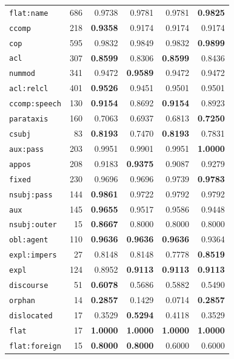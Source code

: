 \begin{table}[ht]
\begin{minipage}[t]{0.60\linewidth}
\begin{tabular}{l r  r r r r}
\texttt{flat\!:\!name} & 686 & 0.9738 & 0.9781 & 0.9781 & \textbf{0.9825} \\
\texttt{ccomp} & 218 & \textbf{0.9358} & 0.9174 & 0.9174 & 0.9174 \\
\texttt{cop} & 595 & 0.9832 & 0.9849 & 0.9832 & \textbf{0.9899} \\
\texttt{acl} & 307 & \textbf{0.8599} & 0.8306 & \textbf{0.8599} & 0.8436 \\
\texttt{nummod} & 341 & 0.9472 & \textbf{0.9589} & 0.9472 & 0.9472 \\
\texttt{acl\!:\!relcl} & 401 & \textbf{0.9526} & 0.9451 & 0.9501 & 0.9501 \\
\texttt{ccomp\!:\!speech} & 130 & \textbf{0.9154} & 0.8692 & \textbf{0.9154} & 0.8923 \\
\texttt{parataxis} & 160 & 0.7063 & 0.6937 & 0.6813 & \textbf{0.7250} \\
\texttt{csubj} & 83 & \textbf{0.8193} & 0.7470 & \textbf{0.8193} & 0.7831 \\
\texttt{aux\!:\!pass} & 203 & 0.9951 & 0.9901 & 0.9951 & \textbf{1.0000} \\
\texttt{appos} & 208 & 0.9183 & \textbf{0.9375} & 0.9087 & 0.9279 \\
\texttt{fixed} & 230 & 0.9696 & 0.9696 & 0.9739 & \textbf{0.9783} \\
\texttt{nsubj\!:\!pass} & 144 & \textbf{0.9861} & 0.9722 & 0.9792 & 0.9792 \\
\texttt{aux} & 145 & \textbf{0.9655} & 0.9517 & 0.9586 & 0.9448 \\
\texttt{nsubj\!:\!outer} & 15 & \textbf{0.8667} & 0.8000 & 0.8000 & 0.8000 \\
\texttt{obl\!:\!agent} & 110 & \textbf{0.9636} & \textbf{0.9636} & \textbf{0.9636} & 0.9364 \\
\texttt{expl\!:\!impers} & 27 & 0.8148 & 0.8148 & 0.7778 & \textbf{0.8519} \\
\texttt{expl} & 124 & 0.8952 & \textbf{0.9113} & \textbf{0.9113} & \textbf{0.9113} \\
\texttt{discourse} & 51 & \textbf{0.6078} & 0.5686 & 0.5882 & 0.5490 \\
\texttt{orphan} & 14 & \textbf{0.2857} & 0.1429 & 0.0714 & \textbf{0.2857} \\
\texttt{dislocated} & 17 & 0.3529 & \textbf{0.5294} & 0.4118 & 0.3529 \\
\texttt{flat} & 17 & \textbf{1.0000} & \textbf{1.0000} & \textbf{1.0000} & \textbf{1.0000} \\
\texttt{flat\!:\!foreign} & 15 & \textbf{0.8000} & \textbf{0.8000} & 0.6000 & 0.6000 \\

\end{tabular}
\end{minipage}
\end{table}
